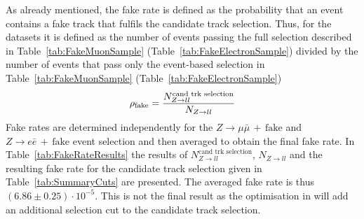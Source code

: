As already mentioned, the fake rate is defined as the probability that an event contains a fake track that fulfils the candidate track selection.
Thus, for the \Zlep datasets it is defined as the number of events passing the full selection described in Table~\ref{tab:FakeMuonSample} (Table~\ref{tab:FakeElectronSample}) divided by the number of events that pass only the event-based selection in Table~\ref{tab:FakeMuonSample} (Table~\ref{tab:FakeElectronSample})
\begin{equation*}
\rho_{\text{fake}} = \frac{N_{Z\rightarrow ll}^{\text{cand trk selection}}}{N_{Z\rightarrow ll}}
\end{equation*}
Fake rates are determined independently for the $Z\rightarrow \mu\bar{\mu}\,+\,\text{fake}$ and $Z\rightarrow e\bar{e}\,+\,\text{fake}$ event selection and then averaged to obtain the final fake rate. 
In Table~\ref{tab:FakeRateResults} the results of $N_{Z\rightarrow ll}^{\text{cand trk selection}}$, $N_{Z\rightarrow ll}$ and the resulting fake rate for the candidate track selection given in Table~\ref{tab:SummaryCuts} are presented.
The averaged fake rate is thus $\left( 6.86 \pm 0.25 \right) \cdot 10^{-5}$.
This is not the final result as the optimisation in \pt will add an additional \pt selection cut to the candidate track selection.

\renewcommand{\arraystretch}{1.5}
\begin{table}[!t]
\centering
\caption{Results of $N_{Z\rightarrow ll}^{\text{cand trk selection}}$, $N_{Z\rightarrow ll}$ and \fakerate for the candidate track selection given in Table~\ref{tab:SummaryCuts}.}
\label{tab:FakeRateResults}
\end{table}  


